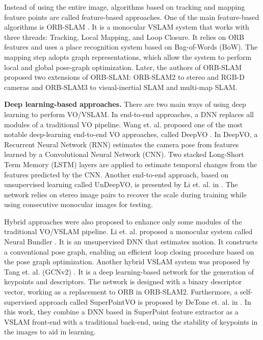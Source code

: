\documentclass[a4paper, 10pt, conference]{ieeeconf}      %
\begin{document}
Instead of using the entire image, algorithms based on tracking and mapping feature points are called feature-based approaches. One of the main feature-based algorithms is ORB-SLAM \cite{orb-slam}. It is a monocular VSLAM system that works with three threads: Tracking, Local Mapping, and Loop Closure. It relies on ORB features and uses a place recognition system based on Bag-of-Words (BoW). The mapping step adopts graph representations, which allow the system to perform local and global pose-graph optimization. Later, the authors of ORB-SLAM proposed two extensions of ORB-SLAM: ORB-SLAM2 \cite{orb-slam2} to stereo and RGB-D cameras and ORB-SLAM3 \cite{orb-slam3} to visual-inertial SLAM and multi-map SLAM.

\textbf{Deep learning-based approaches.} There are two main ways of using deep learning to perform VO/VSLAM. In end-to-end approaches, a DNN replaces all modules of a traditional VO pipeline. Wang et. al. proposed one of the most notable deep-learning end-to-end VO approaches, called DeepVO \cite{deep-vo}. In DeepVO, a Recurrent Neural Network (RNN) estimates the camera pose from features learned by a Convolutional Neural Network (CNN). Two stacked Long-Short Term Memory (LSTM) layers are applied to estimate temporal changes from the features predicted by the CNN. Another end-to-end approach, based on unsupervised learning called UnDeepVO, is presented by Li et. al. in \cite{undeep-vo}. The network relies on stereo image pairs to recover the scale during training while using consecutive monocular images for testing.

Hybrid approaches were also proposed to enhance only some modules of the traditional VO/VSLAM pipeline. Li et. al. proposed a monocular system called Neural Bundler  \cite{pose-graph-optimization}. It is an unsupervised DNN that estimates motion. It constructs a conventional pose graph, enabling an efficient loop closing procedure based on the pose graph optimization. Another hybrid VSLAM system was proposed by Tang et. al. (GCNv2) \cite{gcnv2}. It is a deep learning-based network for the generation of keypoints and descriptors. The network is designed with a binary descriptor vector, working as a replacement to ORB in ORB-SLAM2. Furthermore, a self-supervised approach called SuperPointVO is proposed by DeTone et. al. in \cite{self-improving-vo}. In this work, they combine a DNN based in SuperPoint \cite{superpoint} feature extractor as a VSLAM front-end with a traditional back-end, using the stability of keypoints in the images to aid in learning.
\end{document}
